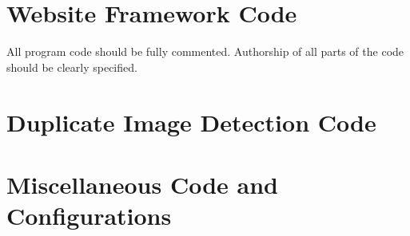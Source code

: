 %
%

\chapter{Website Framework Code}\label{appa:webcode}
All program code should be fully commented. Authorship
of all parts of the code should be clearly specified. 


%

\chapter{Duplicate Image Detection Code}\label{appb:didcode}


\chapter{Miscellaneous Code and Configurations}\label{appc:misccode}
